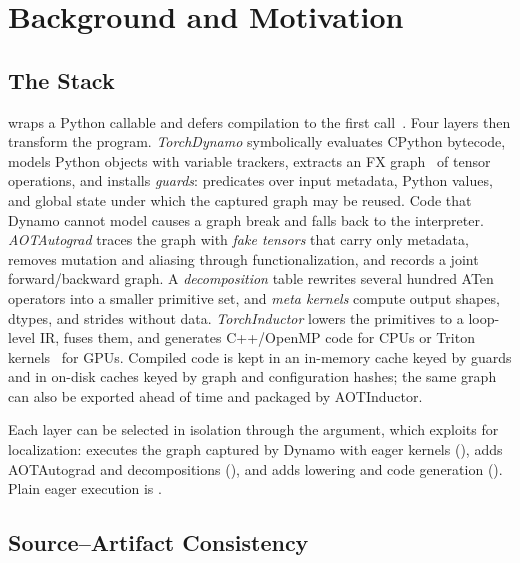 \section{Background and Motivation}
\label{sec:background}

\subsection{The \tcompile Stack}
\label{sec:stack}

\tcompile wraps a Python callable and defers compilation to the first call~\cite{DBLP:conf/asplos/AnselYHGJVBBBBC24}. Four layers then
transform the program. \emph{TorchDynamo} symbolically evaluates CPython bytecode, models Python objects with
variable trackers, extracts an FX graph~\cite{DBLP:conf/mlsys/ReedDHUA22} of tensor operations, and installs \emph{guards}: predicates
over input metadata, Python values, and global state under which the captured graph may be reused. Code that
Dynamo cannot model causes a graph break and falls back to the interpreter. \emph{AOTAutograd} traces the graph
with \emph{fake tensors} that carry only metadata, removes mutation and aliasing through functionalization,
and records a joint forward/backward graph. A \emph{decomposition} table rewrites several hundred ATen operators
into a smaller primitive set, and \emph{meta kernels} compute output shapes, dtypes, and strides without data.
\emph{TorchInductor} lowers the primitives to a loop-level IR, fuses them, and generates C++/OpenMP code for CPUs
or Triton kernels~\cite{DBLP:conf/pldi/TilletKC19} for GPUs. Compiled code is kept in an in-memory cache keyed by guards and in
on-disk caches keyed by graph and configuration hashes; the same graph can also be exported ahead of time and
packaged by AOTInductor.

Each layer can be selected in isolation through the  argument, which \tool exploits for
localization:  executes the graph captured by Dynamo with eager kernels (\EO),
 adds AOTAutograd and decompositions (\ET), and  adds lowering and code
generation (\ER). Plain eager execution is \EZ.

\subsection{Source--Artifact Consistency}
\label{sec:definition}

